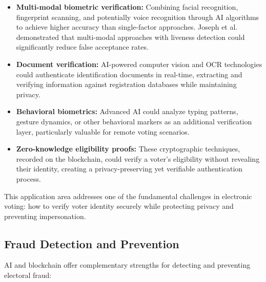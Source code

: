 \documentclass[conference]{IEEEtran}
\begin{document}
\begin{itemize}
    \item \textbf{Multi-modal biometric verification:} Combining facial recognition, fingerprint scanning, and potentially voice recognition through AI algorithms to achieve higher accuracy than single-factor approaches. Joseph et al. \cite{b8} demonstrated that multi-modal approaches with liveness detection could significantly reduce false acceptance rates.
    
    \item \textbf{Document verification:} AI-powered computer vision and OCR technologies could authenticate identification documents in real-time, extracting and verifying information against registration databases while maintaining privacy.
    
    \item \textbf{Behavioral biometrics:} Advanced AI could analyze typing patterns, gesture dynamics, or other behavioral markers as an additional verification layer, particularly valuable for remote voting scenarios.
    
    \item \textbf{Zero-knowledge eligibility proofs:} These cryptographic techniques, recorded on the blockchain, could verify a voter's eligibility without revealing their identity, creating a privacy-preserving yet verifiable authentication process.
\end{itemize}

This application area addresses one of the fundamental challenges in electronic voting: how to verify voter identity securely while protecting privacy and preventing impersonation.

\subsection{Fraud Detection and Prevention}
AI and blockchain offer complementary strengths for detecting and preventing electoral fraud:
\end{document}
